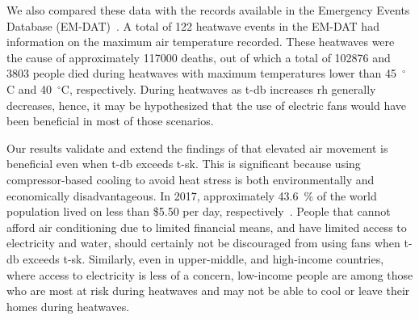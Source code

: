 We also compared these data with the records available in the Emergency Events Database (EM-DAT)~\cite{EMDATThe70:online}.
A total of 122 heatwave events in the EM-DAT had information on the maximum air temperature recorded.
These heatwaves were the cause of approximately 117000 deaths, out of which a total of 102876 and 3803 people died during heatwaves with maximum temperatures lower than 45~$^{\circ}$C and 40~$^{\circ}$C, respectively.
During heatwaves as \ac{t-db} increases \ac{rh} generally decreases, hence, it may be hypothesized that the use of electric fans would have been beneficial in most of those scenarios.


Our results validate and extend the findings of  that elevated air movement is beneficial even when \ac{t-db} exceeds \acf{t-sk}.
This is significant because using compressor-based cooling to avoid heat stress is both environmentally and economically disadvantageous.
In 2017, approximately 43.6~\% of the world population lived on less than \$5.50 per day, respectively~\cite{PovertyO1:online}.
People that cannot afford air conditioning due to limited financial means, and have limited access to electricity and water, should certainly not be discouraged from using fans when \ac{t-db} exceeds \ac{t-sk}.
Similarly, even in upper-middle, and high-income countries, where access to electricity is less of a concern, low-income people are among those who are most at risk during heatwaves and may not be able to cool or leave their homes during heatwaves.


